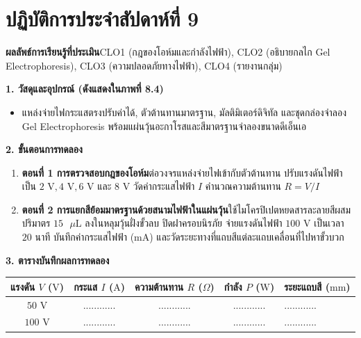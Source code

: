 \section{ปฏิบัติการประจำสัปดาห์ที่ 9}


\begin{labbox}
\noindent\textbf{ผลลัพธ์การเรียนรู้ที่ประเมิน}\quad CLO1 (กฎของโอห์มและกำลังไฟฟ้า), CLO2 (อธิบายกลไก Gel Electrophoresis), CLO3 (ความปลอดภัยทางไฟฟ้า), CLO4 (รายงานกลุ่ม)

\vspace{4pt}
\noindent\textbf{1. วัสดุและอุปกรณ์ (ดังแสดงใน\mbox{ภาพที่} 8.4)}
\begin{itemize}
    \item แหล่งจ่ายไฟกระแสตรงปรับค่าได้, ตัวต้านทานมาตรฐาน, มัลติมิเตอร์ดิจิทัล และชุดกล่องจำลอง Gel Electrophoresis พร้อมแผ่นวุ้นอะกาโรสและสีมาตรฐานจำลองขนาดดีเอ็นเอ
\end{itemize}

\noindent\textbf{2. ขั้นตอนการทดลอง}
\begin{enumerate}
    \item \textbf{ตอนที่ 1 การตรวจสอบกฎของโอห์ม}\quad ต่อวงจรแหล่งจ่ายไฟเข้ากับตัวต้านทาน ปรับแรงดันไฟฟ้าเป็น $2\text{ V}, 4\text{ V}, 6\text{ V}$ และ $8\text{ V}$ วัดค่ากระแสไฟฟ้า $I$ คำนวณความต้านทาน $R = V/I$
    \item \textbf{ตอนที่ 2 การแยกสีย้อมมาตรฐานด้วยสนามไฟฟ้าในแผ่นวุ้น}\quad ใช้ไมโครปิเปตหยดสารละลายสีผสมปริมาตร $15\text{ }\mu\text{L}$ ลงในหลุมวุ้นฝั่งขั้วลบ ปิดฝาครอบนิรภัย จ่ายแรงดันไฟฟ้า $100\text{ V}$ เป็นเวลา $20$ นาที บันทึกค่ากระแสไฟฟ้า ($\text{mA}$) และวัดระยะทางที่แถบสีแต่ละแถบเคลื่อนที่ไปหาขั้วบวก
\end{enumerate}

\noindent\textbf{3. ตารางบันทึกผลการทดลอง}
\begin{center}
\footnotesize\setlength{\tabcolsep}{3.5pt}
\begin{tabularx}{\linewidth}{c c c c >{\raggedright\arraybackslash}X}
\toprule
\textbf{แรงดัน $V$ ($\text{V}$)} & \textbf{กระแส $I$ ($\text{A}$)} & \textbf{ความต้านทาน $R$ ($\Omega$)} & \textbf{กำลัง $P$ ($\text{W}$)} & \textbf{ระยะแถบสี ($\text{mm}$)} \\
\midrule
$50\text{ V}$ & ............ & ............ & ............ & ............ \\
$100\text{ V}$ & ............ & ............ & ............ & ............ \\
\bottomrule
\end{tabularx}
\end{center}
\end{labbox}

